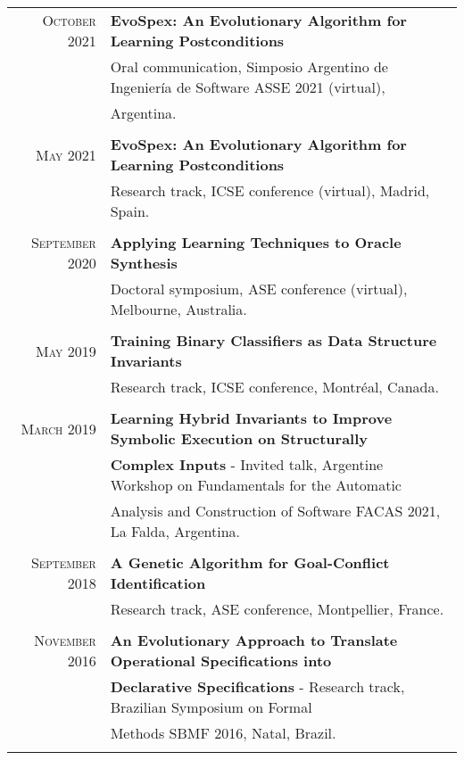 \documentclass[a4paper,10pt]{article} %
\begin{document}
\begin{longtable}{rl}
\textsc{October} 2021 & \textbf{EvoSpex: An Evolutionary Algorithm for Learning Postconditions} \\ 
& Oral communication, Simposio Argentino de Ingeniería de Software ASSE 2021 (virtual), \\ 
& Argentina. \\ & \\

\textsc{May} 2021 & \textbf{EvoSpex: An Evolutionary Algorithm for Learning Postconditions} \\ 
& Research track, ICSE conference (virtual), Madrid, Spain. \\ & \\

\textsc{September} 2020 & \textbf{Applying Learning Techniques to Oracle Synthesis} \\ 
& Doctoral symposium, ASE conference (virtual), Melbourne, Australia. \\ & \\

\textsc{May} 2019 & \textbf{Training Binary Classifiers as Data Structure Invariants} \\ 
& Research track, ICSE conference, Montréal, Canada. \\ & \\

\textsc{March} 2019 & \textbf{Learning Hybrid Invariants to Improve Symbolic Execution on Structurally} \\ 
& \textbf{Complex Inputs} - Invited talk, Argentine Workshop on Fundamentals for the Automatic \\ 
& Analysis and Construction of Software FACAS 2021, La Falda, Argentina. \\ & \\

\textsc{September} 2018 & \textbf{A Genetic Algorithm for Goal-Conflict Identification} \\ 
& Research track, ASE conference, Montpellier, France. \\ & \\

\textsc{November} 2016 & \textbf{An Evolutionary Approach to Translate Operational Specifications into} \\
& \textbf{Declarative Specifications} - Research track, Brazilian Symposium on Formal \\ 
& Methods SBMF 2016, Natal, Brazil. \\ & \\

\end{longtable}
\end{document}
